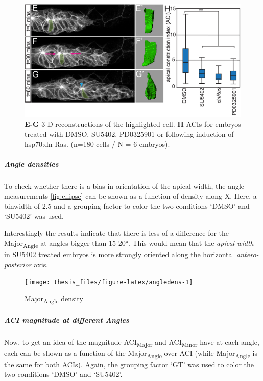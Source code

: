 \documentclass[11pt,singlespacinge,twoside]{reedthesis} %
\begin{document}
\begin{figure}

{\centering \includegraphics[width=0.6\linewidth]{figure/02-MaMo/GrTr/HardingACI} 

}

\caption[Published ACI]{\textbf{E-G} 3-D reconstructions of the highlighted cell. \textbf{H} ACIs for embryos treated with DMSO, SU5402, PD0325901 or following induction of hsp70:dn-Ras. (n=180 cells / N = 6 embryos).}\label{fig:HardingACI}
\end{figure}
\hypertarget{ACI-Angledens}{%
\subparagraph{Angle densities}\label{ACI-Angledens}}

To check whether there is a bias in orientation of the apical width, the angle measurements \ref{fig:ellipse} can be shown as a function of density along X. Here, a binwidth of 2.5 and a grouping factor to color the two conditions `DMSO' and `SU5402' was used.

\noindent Interestingly the results indicate that there is less of a difference for the Major\textsubscript{Angle} at angles bigger than 15-20°. This would mean that the \emph{apical width} in SU5402 treated embryos is more strongly oriented along the horizontal \emph{antero-posterior} axis.


\begin{figure}

{\centering \texttt{[image: thesis\_files/figure-latex/angledens-1]} 

}

\caption{Major\textsubscript{Angle} density}\label{fig:angledens}
\end{figure}
\hypertarget{ACI-mag}{%
\subparagraph{ACI magnitude at different Angles}\label{ACI-mag}}

Now, to get an idea of the magnitude ACI\textsubscript{Major} and ACI\textsubscript{Minor} have at each angle, each can be shown as a function of the Major\textsubscript{Angle} over ACI (while Major\textsubscript{Angle} is the same for both ACIs). Again, the grouping factor `GT' was used to color the two conditions `DMSO' and `SU5402'.
\end{document}
